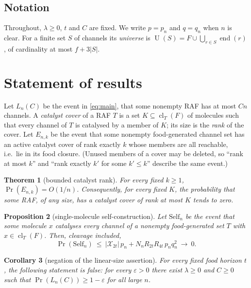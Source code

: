 \documentclass[11pt,a4paper]{article}
\theoremstyle{plain}
\newtheorem{theorem}{Theorem}[section]
\newtheorem{proposition}[theorem]{Proposition}
\newtheorem{corollary}[theorem]{Corollary}
\theoremstyle{definition}
\theoremstyle{remark}
\newcommand{\cl}{\operatorname{cl}}
\newcommand{\cX}{\mathcal X}
\newcommand{\eend}{\operatorname{end}}
\newcommand{\Uni}{\operatorname{U}}
\begin{document}
\subsection{Notation}

Throughout, $\lambda\ge0$, $t$ and $C$ are fixed. We write $p=p_n$ and $q=q_n$ when $n$ is clear. For a finite set $S$ of channels its \emph{universe} is $\Uni(S)=F\cup\bigcup_{r\in S}\eend(r)$, of cardinality at most $f+3|S|$.

\section{Statement of results}\label{sec:results}

Let $L_n(C)$ be the event in \eqref{eq:main}, that some nonempty RAF has at most $Cn$ channels. A \emph{catalyst cover} of a RAF $T$ is a set $K\subseteq\cl_T(F)$ of molecules such that every channel of $T$ is catalysed by a member of $K$; its size is the \emph{rank} of the cover. Let $E_{n,k}$ be the event that some nonempty food-generated channel set has an active catalyst cover of rank exactly $k$ whose members are all reachable, i.e.\ lie in its food closure. (Unused members of a cover may be deleted, so ``rank at most $k$'' and ``rank exactly $k'$ for some $k'\le k$'' describe the same event.)

\begin{theorem}[bounded catalyst rank]\label{thm:rank}
For every fixed $k\ge1$, $\Pr(E_{n,k})=O(1/n)$. Consequently, for every fixed $K$, the probability that some RAF, of any size, has a catalyst cover of rank at most $K$ tends to zero.
\end{theorem}

\begin{proposition}[single-molecule self-construction]\label{prop:single}
Let $\mathrm{Self}_n$ be the event that some molecule $x$ catalyses every channel of a nonempty food-generated set $T$ with $x\in\cl_T(F)$. Then, cleavage included,
\[
\Pr(\mathrm{Self}_n)\ \le\ |\cX_{2t}|\,p_n+N_nR_{2t}R_{4t}\,p_nq_n^2\ \longrightarrow\ 0 .
\]
\end{proposition}

\begin{corollary}[negation of the linear-size assertion]\label{cor:negation}
For every fixed food horizon $t$, the following statement is false: for every $\varepsilon>0$ there exist $\lambda\ge0$ and $C\ge0$ such that $\Pr(L_n(C))\ge1-\varepsilon$ for all large $n$.
\end{corollary}
\end{document}
